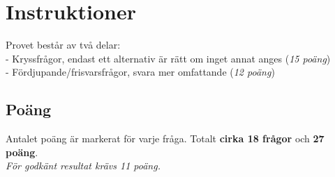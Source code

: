 \documentclass{exam}
\begin{document}
\section*{Instruktioner}
Provet består av två delar:\\
- Kryssfrågor, endast ett alternativ är rätt om inget annat anges (\textit{15 poäng})\\
- Fördjupande/frisvarsfrågor, svara mer omfattande (\textit{12 poäng})

\subsection*{Poäng}
Antalet poäng är markerat för varje fråga. Totalt \textbf{cirka 18 frågor} och \textbf{27 poäng}.\\ \textit{För godkänt resultat krävs 11 poäng.}

\vspace{5mm}
\begin{center}
\end{center}
\vspace{5mm}
\end{document}
